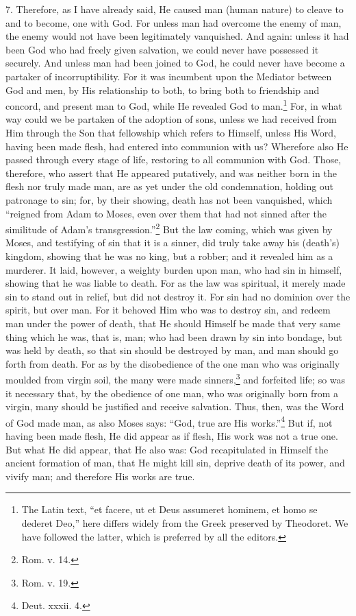 7. Therefore, as I have already said, He caused man (human nature) to cleave to and to become, one with God. For unless man had overcome the enemy of man, the enemy would not have been legitimately vanquished. And again: unless it had been God who had freely given salvation, we could never have possessed it securely. And unless man had been joined to God, he could never have become a partaker of incorruptibility. For it was incumbent upon the Mediator between God and men, by His relationship to both, to bring both to friendship and concord, and present man to God, while He revealed God to man.\footnote{The Latin text, “et facere, ut et Deus assumeret hominem, et homo se dederet Deo,” here differs widely from the Greek preserved by Theodoret. We have followed the latter, which is preferred by all the editors.} For, in what way could we be partaken of the adoption of sons, unless we had received from Him through the Son that fellowship which refers to Himself, unless His Word, having been made flesh, had entered into communion with us? Wherefore also He passed through every stage of life, restoring to all communion with God. Those, therefore, who assert that He appeared putatively, and was neither born in the flesh nor truly made man, are as yet under the old condemnation, holding out patronage to sin; for, by their showing, death has not been vanquished, which “reigned from Adam to Moses, even over them that had not sinned after the similitude of Adam’s transgression.”\footnote{Rom. v. 14.} But the law coming, which was given by Moses, and testifying of sin that it is a sinner, did truly take away his (death’s) kingdom, showing that he was no king, but a robber; and it revealed him as a murderer. It laid, however, a weighty burden upon man, who had sin in himself, showing that he was liable to death. For as the law was spiritual, it merely made sin to stand out in relief, but did not destroy it. For sin had no dominion over the spirit, but over man. For it behoved Him who was to destroy sin, and redeem man under the power of death, that He should Himself be made that very same thing which he was, that is, man; who had been drawn by sin into bondage, but was held by death, so that sin should be destroyed by man, and man should go forth from death. For as by the disobedience of the one man who was originally moulded from virgin soil, the many were made sinners,\footnote{Rom. v. 19.} and forfeited life; so was it necessary that, by the obedience of one man, who was originally born from a virgin, many should be justified and receive salvation. Thus, then, was the Word of God made man, as also Moses says: “God, true are His works.”\footnote{Deut. xxxii. 4.} But if, not having been made flesh, He did appear as if flesh, His work was not a true one. But what He did appear, that He also was: God recapitulated in Himself the ancient formation of man, that He might kill sin, deprive death of its power, and vivify man; and therefore His works are true.


